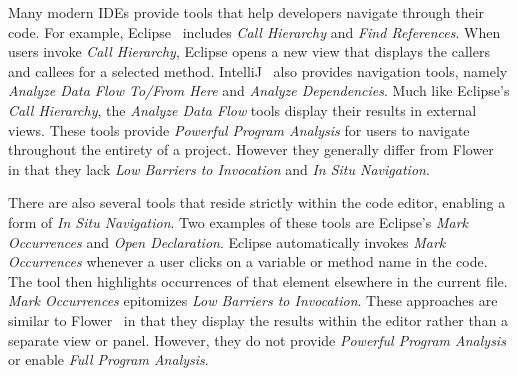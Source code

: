 \documentclass[conference]{IEEEtran}
\newcommand{\toolName}{Flower}
\begin{document}
Many modern IDEs provide tools that help developers navigate through their code. 
For example, Eclipse~\cite{Eclipse} includes \emph{Call Hierarchy} and \emph{Find References}. 
When users invoke \emph{Call Hierarchy}, Eclipse opens a new view that displays the callers and callees for a selected method.  
IntelliJ~\cite{IntelliJ} also provides navigation tools, namely \emph{Analyze Data Flow To/From Here} and \emph{Analyze Dependencies}.
Much like Eclipse's \emph{Call Hierarchy}, the \emph{Analyze Data Flow} tools display their results in external views. 
These tools provide \textit{Powerful Program Analysis} for users to navigate throughout the entirety of a project. 
However they generally differ from \toolName~ in that they lack \textit{Low Barriers to Invocation} and \textit{In Situ Navigation}.

There are also several tools that reside strictly within the code editor, enabling a form of \textit{In Situ Navigation}.
Two examples of these tools are Eclipse's \emph{Mark Occurrences} and \emph{Open Declaration}. 
Eclipse automatically invokes \emph{Mark Occurrences} whenever a user clicks on a variable or method name in the code.
The tool then highlights occurrences of that element elsewhere in the current file.
\emph{Mark Occurrences} epitomizes \textit{Low Barriers to Invocation}.
These approaches are similar to \toolName~ in that they display the results within the editor rather than a separate view or panel.
However, they do not provide \textit{Powerful Program Analysis} or enable \textit{Full Program Analysis}.
\end{document}
